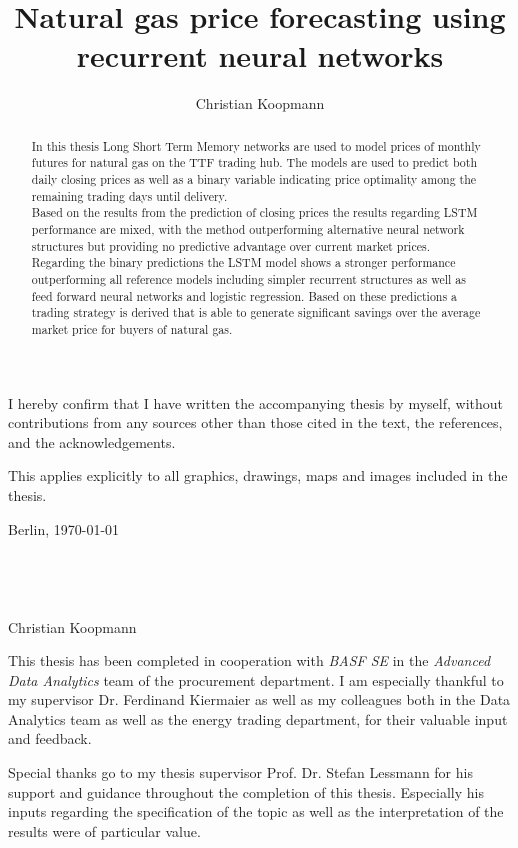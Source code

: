 \documentclass[12pt]{ociamthesis}
\title{\Large{Natural gas price forecasting using recurrent neural networks}}     %
\author{Christian Koopmann}             %
\begin{document}
\maketitle
\begin{romanpages}

\begin{originality}
I hereby confirm that I have written the accompanying thesis by myself, without
contributions from any sources other than those cited in the text, the references, and
the acknowledgements.

This applies explicitly to all graphics, drawings, maps and images included in the
thesis.

Berlin, \today
 \\
 \\
 \\
 \\
 \\
Christian Koopmann
\end{originality}
\newpage
\begin{acknowledgements}
This thesis has been completed in cooperation with \textit{BASF SE} in the \textit{Advanced Data Analytics} team of the procurement department. I am especially thankful to my supervisor Dr. Ferdinand Kiermaier as well as my colleagues both in the Data Analytics team as well as the energy trading department, for their valuable input and feedback.

Special thanks go to my thesis supervisor Prof. Dr. Stefan Lessmann for his support and guidance throughout the completion of this thesis. Especially his inputs regarding the specification of the topic as well as the interpretation of the results were of particular value. 
\end{acknowledgements}
\newpage
\begin{abstract}
In this thesis Long Short Term Memory networks are used to model prices of monthly futures for natural gas on the TTF trading hub. The models are used to predict both daily closing prices as well as a binary variable indicating price optimality among the remaining trading days until delivery.
 \\
Based on the results from the prediction of closing prices the results regarding LSTM performance are mixed, with the method outperforming alternative neural network structures but providing no predictive advantage over current market prices.
 \\
Regarding the binary predictions the LSTM model shows a stronger performance outperforming all reference models including simpler recurrent structures as well as feed forward neural networks and logistic regression. Based on these predictions a trading strategy is derived that is able to generate significant savings over the average market price for buyers of natural gas.
\end{abstract}
\tableofcontents
\listoffigures
\listoftables

\end{romanpages}



\end{document}
